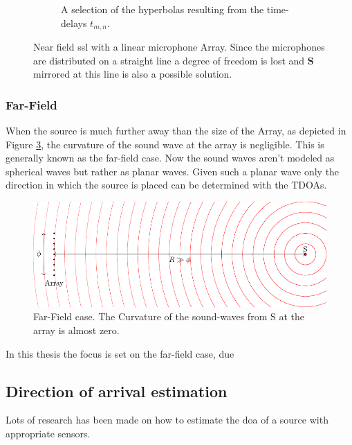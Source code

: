 \begin{figure}[h]
\begin{subfigure}[b]{0.45\textwidth}
    \caption{A selection of the hyperbolas resulting from the time-delays $t_{m,n}$.}
    \label{ssl:fig:hyperbola}
  \end{subfigure}
  \caption{Near field \acrshort{ssl} with a linear microphone Array. 
  Since the microphones are distributed on a straight line a degree of freedom is lost and
  $\bm{S}$ mirrored at this line is also a possible solution.}
  \label{fig:three graphs}
\end{figure}

\subsubsection{Far-Field}
When the source is much further away than the size of the Array, as depicted
in Figure \ref{ssl:fig:far field}, the curvature of the sound wave at the array is negligible.
This is generally known as the far-field case.
Now the sound waves aren't modeled as spherical waves but rather as planar waves.
Given such a planar wave only the direction in which the source is placed can be determined with the TDOAs.


\begin{figure}
  \centering
  \includegraphics[]{FarField.pdf}
  \caption{Far-Field case. The Curvature of the sound-waves from S at the array
  is almost zero.}
  \label{ssl:fig:far field}
\end{figure}

In this thesis the focus is set on the far-field case, due 

\subsection{Direction of arrival estimation}
Lots of research has been made on how to estimate the \acrfull*{doa} of a source
with appropriate sensors.


